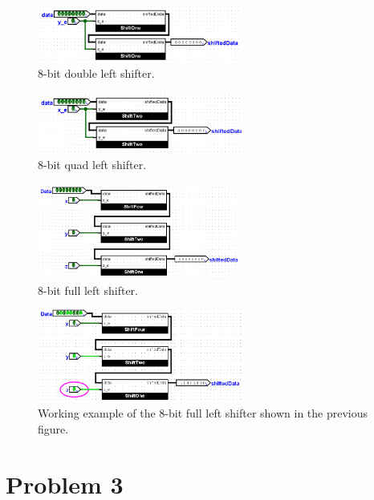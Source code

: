 \documentclass{article}
\begin{document}
\begin{figure}[H]
    \centering
    \includegraphics[width=0.6\textwidth]{./images/8-bit_double_left_sh.png}
    \caption{8-bit double left shifter.}
\end{figure}

\begin{figure}[H]
    \centering
    \includegraphics[width=0.6\textwidth]{./images/8-bit_quad_left_sh.png}
    \caption{8-bit quad left shifter.}
\end{figure}

\begin{figure}[H]
    \centering
    \includegraphics[width=0.6\textwidth]{./images/8-bit_full_left_sh.png}
    \caption{8-bit full left shifter.}
\end{figure}

\begin{figure}[H]
    \centering
    \includegraphics[width=0.6\textwidth]{./images/working_8-bit_full_left_sh.png}
    \caption{Working example of the 8-bit full left shifter shown in the previous figure.}
\end{figure}

\newpage
\section*{Problem 3}
\end{document}
